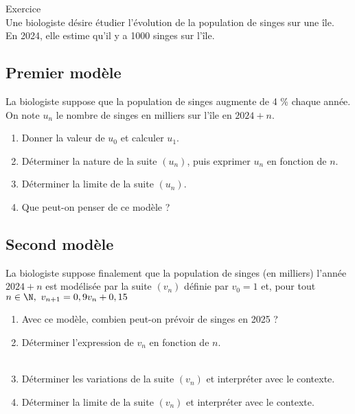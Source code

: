 \documentclass[a4paper,11pt,eval]{nsi}
\newcounter{exoNum}
\newcommand{\exo}[1]
{
	\addtocounter{exoNum}{1}
	{\titlefont\color{UGLiBlue}\Large Exercice\ \theexoNum\ \normalsize{#1}}\smallskip	
}
\begin{document}


\exo{}\\
Une biologiste désire étudier l'évolution de la population de singes sur une île.\\
En 2024, elle estime qu'il y a 1000 singes sur l'île.
\subsection*{Premier modèle} 
La biologiste suppose que la population de singes augmente de 4 \% chaque année.\\
On note $u_n$ le nombre de singes en milliers sur l'île en $2024+n$.
\begin{enumerate}
    \item Donner la valeur de $u_0$ et calculer $u_1$.\\[.5em]
    \item Déterminer la nature de la suite $(u_n)$, puis exprimer $u_n$ en fonction de $n$.\\[.5em]
    \item Déterminer la limite de la suite $(u_n)$.\\[.5em]
    \item Que peut-on penser de ce modèle ?\\[.5em]
\end{enumerate}
\subsection*{Second modèle }
La biologiste suppose finalement que la population de singes (en milliers) l'année $2024+n$ est modélisée par la suite $(v_n)$ définie par $v_0=1$ et, pour tout $n\in\N, \ v_{n+1}=0,9v_n+0,15$
\begin{enumerate}
    \item Avec ce modèle, combien peut-on prévoir de singes en 2025 ?\\[.5em]
    \item Déterminer l'expression de $v_n$ en fonction de $n$.\\[.5em]
    \\
    \item Déterminer les variations de la suite $(v_n)$ et interpréter avec le contexte.\\[.5em]
    \item Déterminer la limite de la suite $(v_n)$ et interpréter avec le contexte.\\[.5em]
\end{enumerate}
\end{document}
